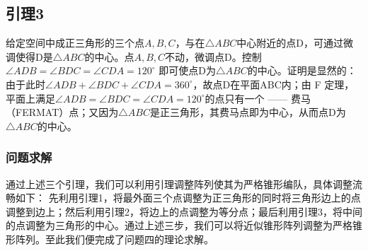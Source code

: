 \documentclass[withoutpreface,bwprint]{cumcmthesis} %
\begin{document}
\subsection*{引理3} 
给定空间中成正三角形的三个点\(A,B,C\)，与在\(\triangle ABC\)中心附近的点D，可通过微调使得D是\(\triangle ABC\)的中心。点\(A,B,C\)不动，微调点D。控制
\(\angle ADB = \angle BDC = \angle CDA = 120^\circ\)
即可使点D为\(\triangle ABC\)的中心。证明是显然的：由于此时\(\angle ADB + \angle BDC + \angle CDA = 360^\circ\)，故点D在平面ABC内；由 F 定理，平面上满足\(\angle ADB = \angle BDC = \angle CDA = 120^\circ\)的点只有一个 —— 费马（FERMAT）点；又因为\(\triangle ABC\)是正三角形，其费马点即为中心，从而点D为\(\triangle ABC\)的中心。
\subsubsection{问题求解}
通过上述三个引理，我们可以利用引理调整阵列使其为严格锥形编队，具体调整流畅如下：
先利用引理1，将最外面三个点调整为正三角形的同时将三角形边上的点调整到边上；然后利用引理2，将边上的点调整为等分点；最后利用引理3，将中间的点调整为三角形的中心。通过上述三步，我们可以将近似锥形阵列调整为严格锥形阵列。至此我们便完成了问题四的理论求解。
\end{document}
